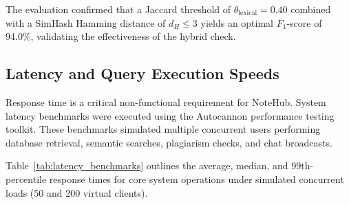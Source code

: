 \documentclass[12,Times new Roman,a4paper]{report}
\renewcommand{\arraystretch}{1.5} %
\begin{document}
\begin{table}[htbp]
\centering
\renewcommand{\arraystretch}{1.5}
\caption{Plagiarism Classification Metrics by Threshold}
\label{tab:plag_metrics}
\end{table}

The evaluation confirmed that a Jaccard threshold of $\theta_{\text{lexical}} = 0.40$ combined with a SimHash Hamming distance of $d_H \le 3$ yields an optimal $F_1$-score of 94.0\%, validating the effectiveness of the hybrid check.

\subsection{Latency and Query Execution Speeds}
Response time is a critical non-functional requirement for NoteHub. System latency benchmarks were executed using the Autocannon performance testing toolkit. These benchmarks simulated multiple concurrent users performing database retrieval, semantic searches, plagiarism checks, and chat broadcasts.

Table~\ref{tab:latency_benchmarks} outlines the average, median, and 99th-percentile response times for core system operations under simulated concurrent loads (50 and 200 virtual clients).
\end{document}
